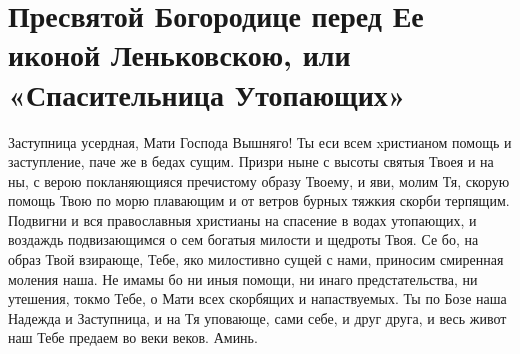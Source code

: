 \section{Пресвятой Богородице перед Ее иконой Леньковскою, или «Спасительница Утопающих»}\begin{mymulticols}
 


Заступница усердная, Мати Господа Вышняго! Ты еси всем xристианом помощь и заступление, паче же в бедах сущим. Призри ныне с высоты святыя Твоея и на ны, с верою покланяющияся пречистому образу Твоему, и яви, молим Тя, скорую помощь Твою по морю плавающим и от ветров бурных тяжкия скорби терпящим. Подвигни и вся православныя христианы на спасение в водах утопающих, и воздаждь подвизающимся о сем богатыя милости и щедроты Твоя. Се бо, на образ Твой взирающе, Тебе, яко милостивно сущей с нами, приносим смиренная моления наша. Не имамы бо ни иныя помощи, ни инаго предстательства, ни утешения, токмо Тебе, о Мати всех скорбящих и напаствуемых. Ты по Бозе наша Надежда и Заступница, и на Тя уповающе, сами себе, и друг друга, и весь живот наш Тебе предаем во веки веков. Аминь.

\end{mymulticols}

